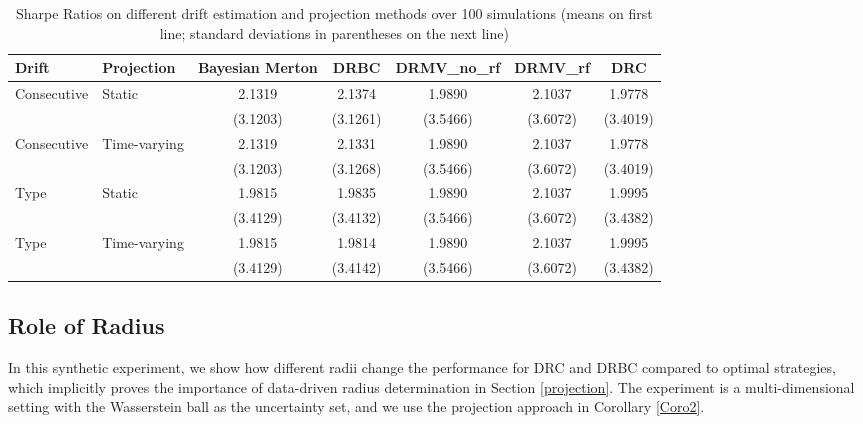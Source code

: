 \documentclass[11pt]{article}
\theoremstyle{definition}
\begin{document}
\begin{table}[htbp]
\centering
\small
\caption{Sharpe Ratios on different drift estimation and projection methods over 100 simulations (means on first line; standard deviations in parentheses on the next line)}
\label{tab:sharpe}
\begin{tabular}{llccccc}
\toprule
Drift & Projection  & Bayesian Merton & DRBC & DRMV\_no\_rf & DRMV\_rf & DRC \\
\midrule
\multirow{2}{*}{Consecutive} & \multirow{2}{*}{Static} 
  & 2.1319 & 2.1374 & 1.9890 & 2.1037 & 1.9778 \\
 &
  & (3.1203) & (3.1261) & (3.5466) & (3.6072) & (3.4019) \\
\multirow{2}{*}{Consecutive} & \multirow{2}{*}{Time-varying} 
  & 2.1319 & 2.1331 & 1.9890 & 2.1037 & 1.9778 \\
 &
  & (3.1203) & (3.1268) & (3.5466) & (3.6072) & (3.4019) \\


\multirow{2}{*}{Type} & \multirow{2}{*}{Static}
  & 1.9815 & 1.9835 & 1.9890 & 2.1037 & 1.9995 \\
&
  & (3.4129) & (3.4132) & (3.5466) & (3.6072) & (3.4382) \\


\multirow{2}{*}{Type} & \multirow{2}{*}{Time-varying} 
  & 1.9815 & 1.9814 & 1.9890 & 2.1037 & 1.9995 \\
 & 
  & (3.4129) & (3.4142) & (3.5466) & (3.6072) & (3.4382) \\



\bottomrule
\end{tabular}
\end{table}


\subsection{Role of Radius}
In this synthetic experiment, we show how different radii change the performance for DRC and DRBC compared to optimal strategies, which implicitly proves the importance of data-driven radius determination in Section \ref{projection}. The experiment is a multi-dimensional setting with the Wasserstein ball as the uncertainty set, and we use the projection approach in Corollary \ref{Coro2}.
\end{document}
